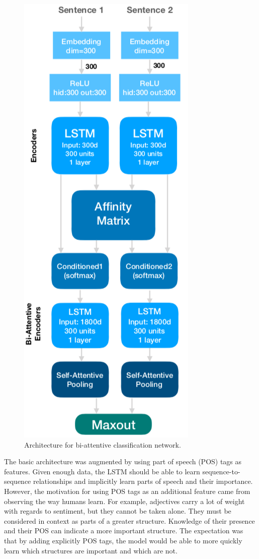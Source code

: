 \begin{figure}[H]
	\includegraphics[scale=0.5]{images/arch_standard.png}
	\caption{Architecture for bi-attentive classification network.}
\end{figure}


The basic architecture was augmented by using part of speech (POS) tags as features. Given enough data, the LSTM should be able to learn sequence-to-sequence relationships and implicitly learn parts of speech and their importance. However, the motivation for using POS tags as an additional feature came from observing the way humans learn. For example, adjectives carry a lot of weight with regards to sentiment, but they cannot be taken alone. They must be considered in context as parts of a greater structure. Knowledge of their presence and their POS can indicate a more important structure. The expectation was that by adding explicitly POS tags, the model would be able to more quickly learn which structures are important and which are not. 

